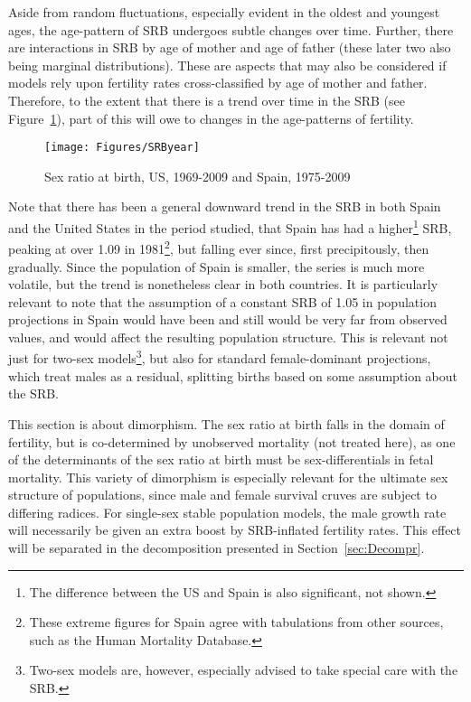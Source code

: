 Aside from random fluctuations, especially evident in the oldest and youngest
ages, the age-pattern of SRB undergoes subtle changes over time. Further, there
are interactions in SRB by age of mother and age of father (these later two
also being marginal distributions). These are aspects that may also be
considered if models rely upon fertility rates cross-classified by age of mother
and father. Therefore, to the extent that there is a trend over time in the SRB
(see Figure~\ref{fig:SRByears}), part of this will owe to changes in the
age-patterns of fertility.

\begin{figure}[ht!]
        \centering  
          \caption{Sex ratio at birth, US, 1969-2009 and Spain,
          1975-2009}
           \texttt{[image: Figures/SRByear]}
          \label{fig:SRByears}
\end{figure}

Note that there has been a general downward trend in the SRB in both Spain and
the United States in the period studied, that Spain has had a
higher\footnote{The difference between the US and Spain is also significant, not
shown.} SRB, peaking at over 1.09 in 1981\footnote{These extreme figures for
Spain agree with tabulations from other sources, such as the Human Mortality
Database.}, but falling ever since, first precipitously, then gradually. Since
the population of Spain is smaller, the series is much more volatile, but the trend is nonetheless clear in both countries. It is particularly relevant to note that
the assumption of a constant SRB of 1.05 in population projections in Spain
would have been and still would be very far from observed values, and would 
affect the resulting population structure. This is relevant not
just for two-sex models\footnote{Two-sex models are, however, especially advised
to take special care with the SRB.}, but also for standard female-dominant
projections, which treat males as a residual, splitting births based on some
assumption about the SRB.

This section is about dimorphism. The sex ratio at birth
falls in the domain of fertility, but is co-determined by unobserved mortality
(not treated here), as one of the determinants of the sex ratio at birth must be
sex-differentials in fetal mortality. This variety of dimorphism is especially relevant for the ultimate
sex structure of populations, since male and female survival cruves are subject 
to differing radices. For single-sex stable population models, the male growth
rate will necessarily be given an extra boost by SRB-inflated fertility
rates. This effect will be separated in the decomposition presented in
Section~\ref{sec:Decompr}.

